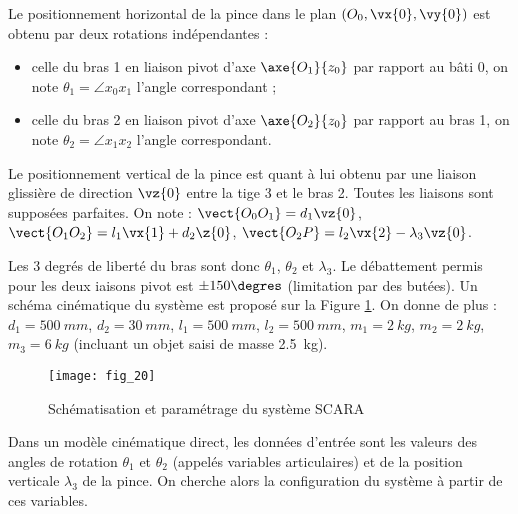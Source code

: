  Le positionnement horizontal de la pince dans le plan $\left(O_0,\vx{0},\vy{0}\right)$ est obtenu par deux rotations indépendantes : 
 \begin{itemize}
 \item celle du bras 1 en liaison pivot d'axe $\axe{O_1}{z_0}$ par rapport au bâti 0, on note $\theta_1 = \angle{x_0}{x_1}$ l'angle correspondant ;
 \item celle du bras 2 en liaison pivot d'axe $\axe{O_2}{z_0}$ par rapport au bras 1, on note $\theta_2 = \angle{x_1}{x_2}$ l'angle correspondant.
 \end{itemize}
 
Le positionnement vertical de la pince est quant à lui obtenu par une liaison glissière de direction
 $\vz{0}$ entre la tige 3 et le bras 2. 
Toutes les liaisons sont supposées parfaites.
On note : $\vect{O_0O_1} = d_1 \vz{0}$, 
$\vect{O_1O_2} = l_1 \vx{1}+d_2 \z{0}$, 
$\vect{O_2 P} =l_2\vx{2} - \lambda_3 \vz{0}$.

Les 3 degrés de liberté du bras sont donc $\theta_1$, $\theta_2$ et $\lambda_3$. Le débattement permis pour les deux iaisons pivot est $\pm 150\degres$ (limitation par des butées). 
Un schéma cinématique du système est proposé sur la Figure \ref{xens_2027_fig20}.
 On donne de plus :
 $d_1 =\SI{500}{mm}$, $d_2 =\SI{30}{mm}$, $l_1=\SI{500}{mm}$, $l_2 =\SI{500}{mm}$, 
$m_1 =\SI{2}{kg}$, $m_2=\SI{2}{kg}$, $m_3 =\SI{6}{kg}$ (incluant un objet saisi de masse \SI{2,5}{kg}).

\begin{figure}[!h]
\centering
\texttt{[image: fig\_20]}
\caption{Schématisation et paramétrage du système SCARA \label{xens_2027_fig20}}
\end{figure}




 Dans un modèle cinématique direct, les données d'entrée sont les valeurs des angles de rotation
$\theta_1$ et $\theta_2$ (appelés variables articulaires) et de la position verticale $\lambda_3$ de la pince. On cherche alors la configuration du système à partir de ces variables. 

 
 
